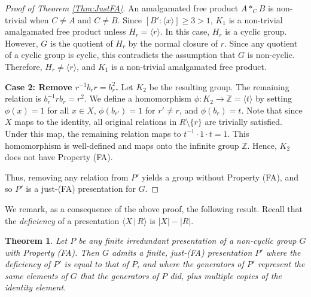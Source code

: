 \documentclass[11pt,oneside]{amsart}
\newtheorem{theorem}{Theorem}
\begin{document}
\begin{proof}[Proof of Theorem \ref{Thm:JustFA}]
An amalgamated free product $A *_C B$ is non-trivial when $C \not= A$ and $C \not= B$.
Since $[B' : \langle x \rangle] \ge 3 > 1$, $K_1$ is a non-trivial amalgamated free product unless $H_{r} = \langle r \rangle$.
In this case, $H_{r}$ is a cyclic group. However, $G$ is the quotient of $H_{r}$ by the normal closure of $r$. Since any quotient of a cyclic group is cyclic, this contradicts the assumption that $G$ is non-cyclic. Therefore, $H_{r} \neq \langle r \rangle$, and $K_1$ is a non-trivial amalgamated free product.

\textbf{Case 2: Remove $r^{-1} b_{r} r = b_{r}^2$.}
Let $K_2$ be the resulting group. The remaining relation is $b_{r}^{-1} r b_{r} = r^2$.
We define a homomorphism $\phi: K_2 \to \mathbb{Z} = \langle t \rangle$ by setting $\phi(x)=1$ for all $x \in X$, $\phi(b_{r'})=1$ for $r' \neq r$, and $\phi(b_{r})=t$. Note that since $X$ maps to the identity, all original relations in $R \setminus \{r\}$ are trivially satisfied. Under this map, the remaining relation maps to $t^{-1} \cdot 1 \cdot t = 1$. This homomorphism is well-defined and maps onto the infinite group $\mathbb{Z}$. Hence, $K_2$ does not have Property (FA).

Thus, removing any relation from $P'$ yields a group without Property (FA), and so $P'$ is a just-(FA) presentation for $G$.
\end{proof}

We remark, as a consequence of the above proof, the following result. Recall that the \emph{deficiency} of a presentation $\langle X \, | \, R \rangle$ is $|X| - |R|$.

\begin{theorem}
Let $P$ be any finite irredundant presentation of a non-cyclic group $G$ with Property (FA). Then $G$ admits a finite, just-(FA) presentation $P'$ where the deficiency of $P'$ is equal to that of $P$, and where the generators of $P'$ represent the same elements of $G$ that the generators of $P$ did, plus multiple copies of the identity element.
\end{theorem}
\end{document}
